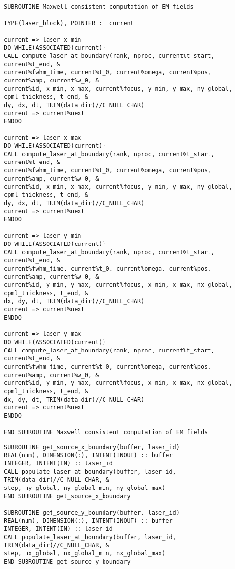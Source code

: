 \begin{lstlisting}[style=FORTRAN, caption=Fortran subroutines for Maxwell consistent computation of laser fields at boundaries]
SUBROUTINE Maxwell_consistent_computation_of_EM_fields

TYPE(laser_block), POINTER :: current

current => laser_x_min
DO WHILE(ASSOCIATED(current))
CALL compute_laser_at_boundary(rank, nproc, current%t_start, current%t_end, &
current%fwhm_time, current%t_0, current%omega, current%pos, current%amp, current%w_0, &
current%id, x_min, x_max, current%focus, y_min, y_max, ny_global, cpml_thickness, t_end, &
dy, dx, dt, TRIM(data_dir)//C_NULL_CHAR)
current => current%next
ENDDO

current => laser_x_max
DO WHILE(ASSOCIATED(current))
CALL compute_laser_at_boundary(rank, nproc, current%t_start, current%t_end, &
current%fwhm_time, current%t_0, current%omega, current%pos, current%amp, current%w_0, &
current%id, x_min, x_max, current%focus, y_min, y_max, ny_global, cpml_thickness, t_end, &
dy, dx, dt, TRIM(data_dir)//C_NULL_CHAR)
current => current%next
ENDDO

current => laser_y_min
DO WHILE(ASSOCIATED(current))
CALL compute_laser_at_boundary(rank, nproc, current%t_start, current%t_end, &
current%fwhm_time, current%t_0, current%omega, current%pos, current%amp, current%w_0, &
current%id, y_min, y_max, current%focus, x_min, x_max, nx_global, cpml_thickness, t_end, &
dx, dy, dt, TRIM(data_dir)//C_NULL_CHAR)
current => current%next
ENDDO

current => laser_y_max
DO WHILE(ASSOCIATED(current))
CALL compute_laser_at_boundary(rank, nproc, current%t_start, current%t_end, &
current%fwhm_time, current%t_0, current%omega, current%pos, current%amp, current%w_0, &
current%id, y_min, y_max, current%focus, x_min, x_max, nx_global, cpml_thickness, t_end, &
dx, dy, dt, TRIM(data_dir)//C_NULL_CHAR)
current => current%next
ENDDO

END SUBROUTINE Maxwell_consistent_computation_of_EM_fields
\end{lstlisting}

\begin{lstlisting}[style=FORTRAN, caption=Fortran subroutines for populating laser sources at boundaries]
SUBROUTINE get_source_x_boundary(buffer, laser_id)
REAL(num), DIMENSION(:), INTENT(INOUT) :: buffer
INTEGER, INTENT(IN) :: laser_id
CALL populate_laser_at_boundary(buffer, laser_id, TRIM(data_dir)//C_NULL_CHAR, &
step, ny_global, ny_global_min, ny_global_max)
END SUBROUTINE get_source_x_boundary
  
SUBROUTINE get_source_y_boundary(buffer, laser_id)
REAL(num), DIMENSION(:), INTENT(INOUT) :: buffer
INTEGER, INTENT(IN) :: laser_id
CALL populate_laser_at_boundary(buffer, laser_id, TRIM(data_dir)//C_NULL_CHAR, &
step, nx_global, nx_global_min, nx_global_max)
END SUBROUTINE get_source_y_boundary
\end{lstlisting}

